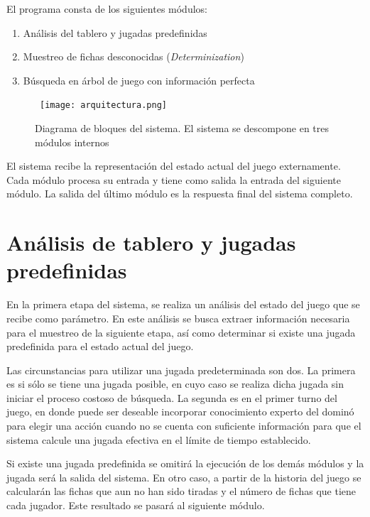 El programa consta de los siguientes módulos:

\begin{enumerate}
   \item Análisis del tablero y jugadas predefinidas
   \item Muestreo de fichas desconocidas (\textit{Determinization})
   \item Búsqueda en árbol de juego con información perfecta
\end{enumerate}


\begin{figure}[ht]
   \begin{center}
      \hbox{\hspace{-5em} \texttt{[image: arquitectura.png]}}
      \caption{Diagrama de bloques del sistema. El sistema se descompone en tres módulos internos}
      \label{ARQ}
   \end{center}
\end{figure}
El sistema recibe la representación del estado actual del juego externamente.
Cada módulo procesa su entrada y tiene como salida la entrada del siguiente
módulo. La salida del último módulo es la respuesta final del sistema completo.

\section{Análisis de tablero y jugadas predefinidas}

En la primera etapa del sistema, se realiza un análisis del estado del juego que
se recibe como parámetro. En este análisis se busca extraer información
necesaria para el muestreo de la siguiente etapa, así como determinar si existe
una jugada predefinida para el estado actual del juego.

Las circunstancias para utilizar una jugada predeterminada son dos. La primera
es si sólo se tiene una jugada posible, en cuyo caso se realiza dicha jugada sin
iniciar el proceso costoso de búsqueda. La segunda es en el primer turno del
juego, en donde puede ser deseable incorporar conocimiento experto del dominó
para elegir una acción cuando no se cuenta con suficiente información para que
el sistema calcule una jugada efectiva en el límite de tiempo establecido.

Si existe una jugada predefinida se omitirá la ejecución de los demás módulos y
la jugada será la salida del sistema. En otro caso, a partir de la historia del
juego se calcularán las fichas que aun no han sido tiradas y el número de fichas
que tiene cada jugador. Este resultado se pasará al siguiente módulo.

